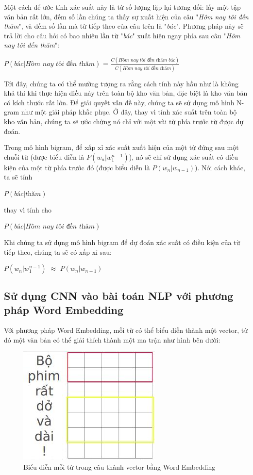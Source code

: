 Một cách để ước tính xác suất này là từ số lượng lặp lại tương đối: lấy một tập văn bản rất lớn, đếm số lần chúng ta thấy sự xuất hiện của câu "\textit{Hôm nay tôi đến thăm}", và đếm số lần mà từ tiếp theo của câu trên là "\textit{bác}". Phương pháp này sẽ trả lời cho câu hỏi có bao nhiêu lần từ "\textit{bác}" xuất hiện ngay phía sau câu "\textit{Hôm nay tôi đến thăm}":
\begin{center}
    $P(\textit{bác} | \textit{Hôm nay tôi đến thăm})$ =
    $\frac{C(\textit{Hôm nay tôi đến thăm bác})}{C(\textit{Hôm nay tôi đến thăm})}$
\end{center}

Tới đây, chúng ta có thể mường tượng ra rằng cách tính này hầu như là không khả thi khi thực hiện điều này trên toàn bộ kho văn bản, đặc biệt là kho văn bản có kích thước rất lớn. Để giải quyết vấn đề này, chúng ta sẽ sử dụng mô hình N-gram như một giải pháp khắc phục. Ở đây, thay vì tính xác suất trên toàn bộ kho văn bản, chúng ta sẽ ước chừng nó chỉ với một vài từ phía trước từ được dự đoán.

Trong mô hình bigram, để xấp xỉ xác suất xuất hiện của một từ đứng sau một chuỗi từ (được biểu diễn là $P(w_{n}|w^{n-1}_{1})$), nó sẽ chỉ sử dụng xác suất có điều kiện của một từ phía trước đó (được biểu diễn là $P(w_{n}|w_{n-1})$). Nói cách khác, ta sẽ tính
\begin{center}
    $P(\textit{bác} | \textit{thăm})$
\end{center}

thay vì tính cho
\begin{center}
    $P(\textit{bác} | \textit{Hôm nay tôi đến thăm})$
\end{center}

Khi chúng ta sử dụng mô hình bigram để dự đoán xác suất có điều kiện của từ tiếp theo, chúng ta sẽ có xấp xỉ sau:
\begin{center}
     $P(w_{n}|w^{n-1}_{1})$ $\approx$  $P(w_{n}|w_{n-1})$
\end{center}

\subsection{Sử dụng CNN vào bài toán NLP với phương pháp Word Embedding}
Với phương pháp Word Embedding, mỗi từ có thể biểu diễn thành một vector, từ đó một văn bản có thể giải thích thành một ma trận như hình bên dưới:
\begin{figure}[!h]
	\centering
		\includegraphics[width=0.3\columnwidth]{books/artificial-neural-network/chapter05/figure/convolution-example-8.jpg}
        \caption{Biểu diễn mỗi từ trong câu thành vector bằng Word Embedding}
        \label{fig:convolutionexample8}
\end{figure}

